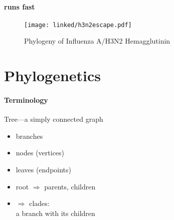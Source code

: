 \documentclass{beamer}
\begin{document}
\begin{darkframes}
    \begin{frame}{\secname}
      \framesubtitle{runs fast}
      \begin{figure}
        \texttt{[image: linked/h3n2escape.pdf]}
        \caption{\footnotesize Phylogeny of Influenza A/H3N2 Hemagglutinin \cite{volzKoelle+13}}
      \end{figure}
    \end{frame}








  \section{Phylogenetics}

    \begin{frame}{\secname}
      \framesubtitle{Terminology}


      Tree---a simply connected graph

      \begin{itemize}
        \item branches

        \item nodes (vertices)

        \item leaves (endpoints)

        \item root $\Rightarrow$ parents, children

        \item {} $\Rightarrow$ clades:\\
        \hspace*{.5cm}a branch with its children


\end{itemize}
\end{frame}
\end{darkframes}
\end{document}
